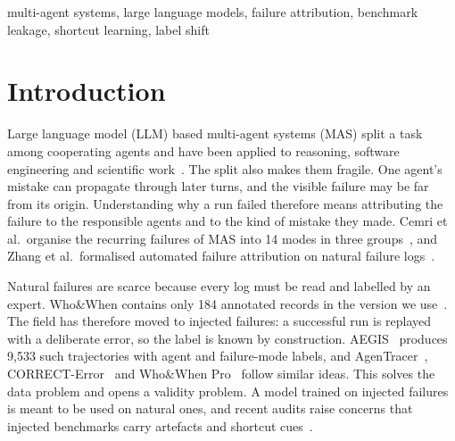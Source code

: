 \documentclass[conference]{IEEEtran}
\begin{document}
\begin{IEEEkeywords}
multi-agent systems, large language models, failure attribution, benchmark leakage, shortcut learning, label shift
\end{IEEEkeywords}

\section{Introduction}
Large language model (LLM) based multi-agent systems (MAS) split a task among cooperating agents and have been applied to reasoning, software engineering and scientific work~\cite{wu,hong,du,qian}. The split also makes them fragile. One agent's mistake can propagate through later turns, and the visible failure may be far from its origin. Understanding why a run failed therefore means attributing the failure to the responsible agents and to the kind of mistake they made. Cemri et al.\ organise the recurring failures of MAS into 14 modes in three groups~\cite{mast}, and Zhang et al.\ formalised automated failure attribution on natural failure logs~\cite{whowhen}.

Natural failures are scarce because every log must be read and labelled by an expert. Who\&When contains only 184 annotated records in the version we use~\cite{whowhen}. The field has therefore moved to injected failures: a successful run is replayed with a deliberate error, so the label is known by construction. AEGIS~\cite{aegis} produces 9,533 such trajectories with agent and failure-mode labels, and AgenTracer~\cite{agentracer}, CORRECT-Error~\cite{correct} and Who\&When Pro~\cite{whenpro} follow similar ideas. This solves the data problem and opens a validity problem. A model trained on injected failures is meant to be used on natural ones, and recent audits raise concerns that injected benchmarks carry artefacts and shortcut cues~\cite{audit1,audit2,catch}.
\end{document}
